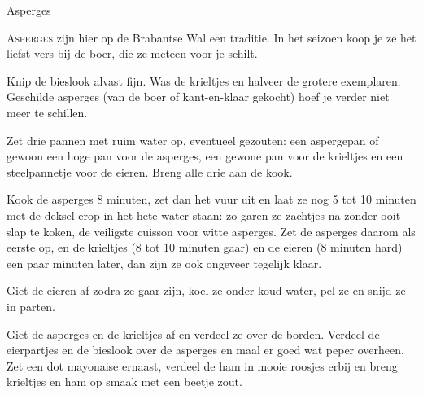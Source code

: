 \begin{recipe}{Asperges}


\lettrine{A}{sperges} zijn hier op de Brabantse Wal een traditie. In het
seizoen koop je ze het liefst vers bij de boer, die ze meteen voor je
schilt.

\begin{ingredients}
\end{ingredients}

\begin{steps}
  \item Knip de bieslook alvast fijn. Was de krieltjes en halveer de grotere
        exemplaren. Geschilde asperges (van de boer of kant-en-klaar
        gekocht) hoef je verder niet meer te schillen.
  \item Zet drie pannen met ruim water op, eventueel gezouten: een
        aspergepan of gewoon een hoge pan voor de asperges, een gewone pan
        voor de krieltjes en een steelpannetje voor de eieren. Breng alle
        drie aan de kook.
  \item Kook de asperges 8 minuten, zet dan het vuur uit en laat ze nog 5 tot
        10 minuten met de deksel erop in het hete water staan: zo garen ze
        zachtjes na zonder ooit slap te koken, de veiligste cuisson voor
        witte asperges. Zet de asperges daarom als eerste op, en de krieltjes
        (8 tot 10 minuten gaar) en de eieren (8 minuten hard) een paar
        minuten later, dan zijn ze ook ongeveer tegelijk klaar.
  \item Giet de eieren af zodra ze gaar zijn, koel ze onder koud water, pel
        ze en snijd ze in parten.
  \item Giet de asperges en de krieltjes af en verdeel ze over de borden.
        Verdeel de eierpartjes en de bieslook over de asperges en maal er
        goed wat peper overheen. Zet een dot mayonaise ernaast, verdeel de
        ham in mooie roosjes erbij en breng krieltjes en ham op smaak met
        een beetje zout.
\end{steps}
\end{recipe}
